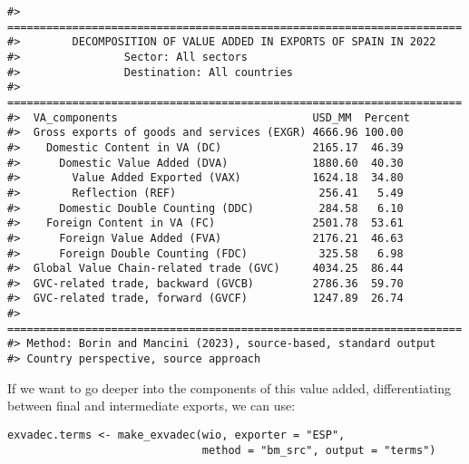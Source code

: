 \begin{verbatim}
#> ======================================================================
#>        DECOMPOSITION OF VALUE ADDED IN EXPORTS OF SPAIN IN 2022
#>                Sector: All sectors
#>                Destination: All countries
#> ======================================================================
#>  VA_components                              USD_MM  Percent
#>  Gross exports of goods and services (EXGR) 4666.96 100.00 
#>    Domestic Content in VA (DC)              2165.17  46.39 
#>      Domestic Value Added (DVA)             1880.60  40.30 
#>        Value Added Exported (VAX)           1624.18  34.80 
#>        Reflection (REF)                      256.41   5.49 
#>      Domestic Double Counting (DDC)          284.58   6.10 
#>    Foreign Content in VA (FC)               2501.78  53.61 
#>      Foreign Value Added (FVA)              2176.21  46.63 
#>      Foreign Double Counting (FDC)           325.58   6.98 
#>  Global Value Chain-related trade (GVC)     4034.25  86.44 
#>  GVC-related trade, backward (GVCB)         2786.36  59.70 
#>  GVC-related trade, forward (GVCF)          1247.89  26.74 
#> ======================================================================
#> Method: Borin and Mancini (2023), source-based, standard output
#> Country perspective, source approach
\end{verbatim}

If we want to go deeper into the components of this value added,
differentiating between final and intermediate exports, we can use:

\begin{verbatim}
exvadec.terms <- make_exvadec(wio, exporter = "ESP", 
                              method = "bm_src", output = "terms")
\end{verbatim}

